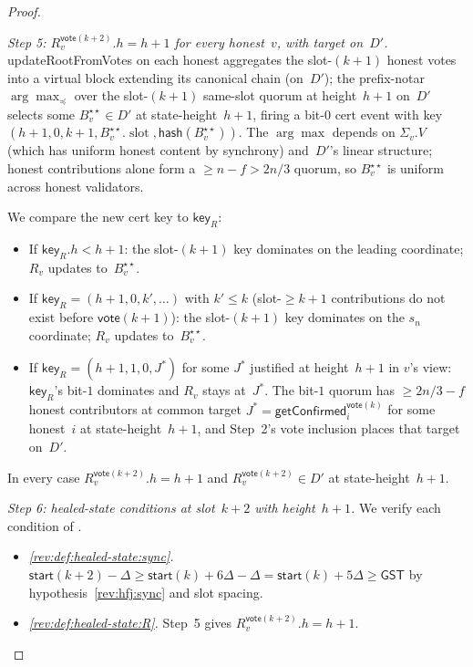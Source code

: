 \documentclass{article}
\newcommand{\slot}[0]{\ensuremath{\operatorname{\mathrm{slot}}}}
\newcommand{\hash}{\mathsf{hash}}
\newcommand{\key}{\mathsf{key}}
\newcommand{\start}{\mathsf{start}}
\newcommand{\vote}{\mathsf{vote}}
\newcommand{\updateRootFromVotes}{\textsf{updateRootFromVotes}\xspace}
\newcommand{\getConfirmed}{\textsf{getConfirmed}\xspace}
\theoremstyle{plain}
\theoremstyle{definition}
\theoremstyle{remark}
\newcommand{\GST}{\ensuremath{\mathsf{GST}}}
\begin{document}
\begin{proof}
\begin{description}
\begin{description}
\emph{Step 5: $R_v^{\vote(k+2)}.h = h+1$ for every honest~$v$, with target on~$D'$.}
\updateRootFromVotes{} on each honest aggregates the slot-$(k+1)$ honest votes into a virtual block extending its canonical chain (on~$D'$); the prefix-notar $\arg\max_\preceq$ over the slot-$(k+1)$ same-slot quorum at height~$h+1$ on~$D'$ selects some $B^{\star\star}_v \in D'$ at state-height~$h+1$, firing a bit-$0$ cert event with key $(h+1, 0, k+1, B^{\star\star}_v.\slot, \hash(B^{\star\star}_v))$. The $\arg\max$ depends on $\Sigma_v.V$ (which has uniform honest content by synchrony) and~$D'$'s linear structure; honest contributions alone form a $\geq n - f > 2n/3$ quorum, so $B^{\star\star}_v$ is uniform across honest validators.

We compare the new cert key to $\key_R$:
\begin{itemize}
  \item If $\key_R.h < h+1$: the slot-$(k+1)$ key dominates on the leading coordinate; $R_v$ updates to~$B^{\star\star}_v$.
  \item If $\key_R = (h+1, 0, k', \ldots)$ with $k' \leq k$ (slot-$\geq k+1$ contributions do not exist before $\vote(k+1)$): the slot-$(k+1)$ key dominates on the $s_n$ coordinate; $R_v$ updates to~$B^{\star\star}_v$.
  \item If $\key_R = (h+1, 1, 0, J^*)$ for some $J^*$ justified at height~$h+1$ in $v$'s view: $\key_R$'s bit-$1$ dominates and $R_v$ stays at~$J^*$. The bit-$1$ quorum has $\geq 2n/3 - f$ honest contributors at common target $J^* = \getConfirmed_i^{\vote(k)}$ for some honest~$i$ at state-height~$h+1$, and Step~2's vote inclusion places that target on~$D'$.
\end{itemize}
In every case $R_v^{\vote(k+2)}.h = h+1$ and $R_v^{\vote(k+2)} \in D'$ at state-height~$h+1$.

\emph{Step 6: healed-state conditions at slot~$k+2$ with height~$h+1$.}
We verify each condition of .
\begin{itemize}
  \item \emph{\ref{rev:def:healed-state:sync}.}
  $\start(k+2) - \Delta \geq \start(k) + 6\Delta - \Delta = \start(k) + 5\Delta \geq \GST$ by hypothesis~\ref{rev:hfj:sync} and slot spacing.

  \item \emph{\ref{rev:def:healed-state:R}.}
  Step~5 gives $R_v^{\vote(k+2)}.h = h+1$.


\end{itemize}
\end{description}
\end{description}
\end{proof}
\end{document}
